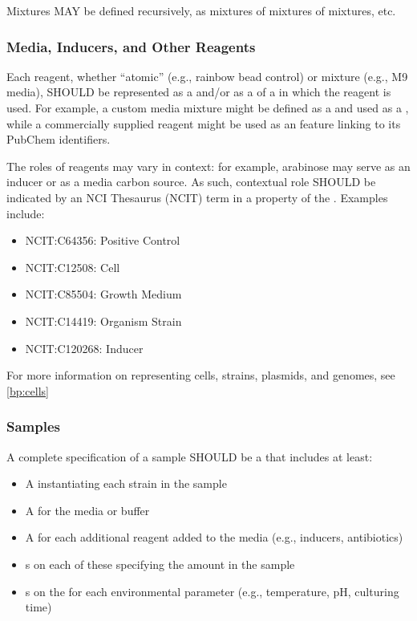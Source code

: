 Mixtures MAY be defined recursively, as mixtures of mixtures of mixtures, etc.

\subsubsection{Media, Inducers, and Other Reagents}

Each reagent, whether ``atomic'' (e.g., rainbow bead control) or mixture (e.g., M9 media), SHOULD be represented as a  and/or as a  of a  in which the reagent is used.
For example, a custom media mixture might be defined as a  and used as a , while a commercially supplied reagent might be used as an  feature linking to its PubChem identifiers.

The roles of reagents may vary in context: for example, arabinose may serve as an inducer or as a media carbon source. As such, contextual role SHOULD be indicated by an NCI Thesaurus (NCIT) term in a  property of the . Examples include:
\begin{itemize}
\item NCIT:C64356: Positive Control
\item NCIT:C12508: Cell
\item NCIT:C85504: Growth Medium
\item NCIT:C14419: Organism Strain
\item NCIT:C120268: Inducer
\end{itemize}

For more information on representing cells, strains, plasmids, and genomes, see \ref{bp:cells}


\subsubsection{Samples}

A complete specification of a sample SHOULD be a  that includes at least:
\begin{itemize}
\item A  instantiating each strain in the sample
\item A  for the media or buffer
\item A  for each additional reagent added to the media (e.g., inducers, antibiotics)
\item {}s on each of these specifying the amount in the sample
\item {}s on the  for each environmental parameter (e.g., temperature, pH, culturing time)
\end{itemize}

